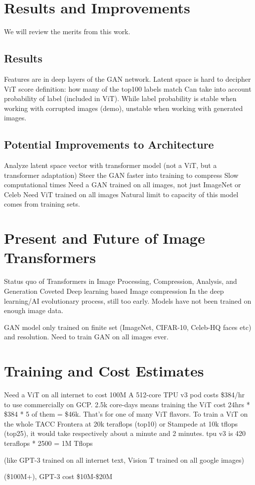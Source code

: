 \section{Results and Improvements}
We will review the merits from this work.

\subsection{Results}

Features are in deep layers of the GAN network. 
Latent space is hard to decipher
ViT score definition: how many of the top100 labels match
Can take into account probability of label (included in ViT).
While label probability is stable when working with corrupted images (demo), 
unstable when working with generated images.

\subsection{Potential Improvements to Architecture}

Analyze latent space vector with transformer model (not a ViT, but a transformer adaptation)
Steer the GAN faster into training to compress
Slow computational times
Need a GAN trained on all images, not just ImageNet or Celeb 
Need ViT trained on all images
Natural limit to capacity of this model comes from training sets.



\newpage
\section{Present and Future of Image Transformers}
Status quo of Transformers in Image Processing, Compression, Analysis, and Generation
Coveted Deep learning based Image compression 
In the deep learning/AI evolutionary process, still too early. Models have not been trained on enough image data.

GAN model only trained on finite set (ImageNet, CIFAR-10, Celeb-HQ faces etc) and resolution.
Need to train GAN on all images ever.


\section{Training and Cost Estimates}

Need a ViT on all internet to cost 100M
A 512-core TPU v3 pod costs \$384/hr to use commercially on GCP. 
2.5k core-days means training the ViT cost 24hrs * \$384 * 5 of them = \$46k. 
That's for one of many ViT flavors.
To train a ViT on the whole TACC Frontera at 20k teraflops (top10) or 
Stampede at 10k tflops (top25), it would take respectively about a minute and 2 minutes.
tpu v3 is 420 teraflops * 2500 = 1M Tflops

(like GPT-3 trained on all internet text, Vision T trained on all google images)

(\$100M+), GPT-3 cost \$10M-\$20M